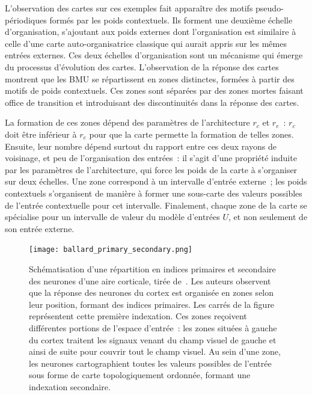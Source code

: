 \documentclass[../main]{subfiles}
\begin{document}
L'observation des cartes sur ces exemples fait apparaître des motifs pseudo-périodiques formés par les poids contextuels. Ils forment une deuxième échelle d'organisation, s'ajoutant aux poids externes dont l'organisation est similaire à celle d'une carte auto-organisatrice classique qui aurait appris sur les mêmes entrées externes.
Ces deux échelles d'organisation sont un mécanisme qui émerge du processus d'évolution des cartes.
L'observation de la réponse des cartes montrent que les BMU se répartissent en zones distinctes, formées à partir des motifs de poids contextuels. Ces zones sont séparées par des zones mortes faisant office de transition et introduisant des discontinuités dans la réponse des cartes.

La formation de ces zones dépend des paramètres de l'architecture $r_c$ et $r_e$~: $r_c$ doit être inférieur à $r_e$ pour que la carte permette la formation de telles zones. 
Ensuite, leur nombre dépend surtout du rapport entre ces deux rayons de voisinage, et peu de l'organisation des entrées~: il s'agit d'une propriété induite par les paramètres de l'architecture, qui force les poids de la carte à s'organiser sur deux échelles.
Une zone correspond à un intervalle d'entrée externe~; les poids contextuels s'organisent de manière à former une sous-carte des valeurs possibles de l'entrée contextuelle pour cet intervalle.
Finalement, chaque zone de la carte se spécialise pour un intervalle de valeur du modèle d'entrées $U$, et non seulement de son entrée externe.

\begin{figure}
	\centering\texttt{[image: ballard\_primary\_secondary.png]}
	\vspace{-0.5cm}
	\caption{Schématisation d'une répartition en indices primaires et secondaire des neurones d'une aire corticale, tirée de~\cite{ballard_cortical_1986}. 
	Les auteurs observent que la réponse des neurones du cortex est organisée en zones selon leur position, formant des indices primaires. Les carrés de la figure représentent cette première indexation.
	Ces zones reçoivent différentes portions de l'espace d'entrée~: les zones situées à gauche du cortex traitent les signaux venant du champ visuel de gauche et ainsi de suite pour couvrir tout le champ visuel.
	Au sein d'une zone, les neurones cartographient toutes les valeurs possibles de l'entrée sous forme de carte topologiquement ordonnée, formant une indexation secondaire. \label{fig:ballard}}
\end{figure}
\end{document}
